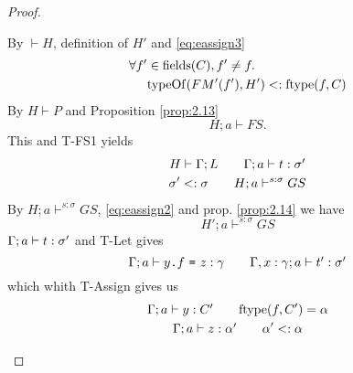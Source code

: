 \begin{proof}
\begin{description}
\begin{description}
\begin{description}
              \vspace{2em}
              By $\vdash H$, definition of $H'$ and \eqref{eq:eassign3}
              \begin{equation} \label{eq:eassign4}
                \begin{aligned}
                  \forall f' &\in \mbox{$\mathrm{fields}$}(C), f' \neq f. \\ 
                                 &\mbox{$\mathrm{typeOf}$}(FM'(f'), H') <: \mbox{$\mathrm{ftype}$}(f, C)
                \end{aligned}
              \end{equation}
              By $H \vdash P$ and Proposition \ref{prop:2.13}
              \begin{equation} \label{eq:eassign5}
                H;a \vdash FS.
              \end{equation}
              This and {\sc T-FS1} yields
              \begin{equation}\label{eq:eassign6}
                \begin{gathered}
                  H \vdash \Gamma; L \quad\quad \mbox{$\Gamma;a\vdash t:\sigma'$} \\
                  \sigma' <: \sigma \quad\quad H; a \vdash^{s: \sigma} GS
                \end{gathered}
              \end{equation}
              By $H;a \vdash^{s: \sigma} GS$, \eqref{eq:eassign2} and prop.
              \ref{prop:2.14} we have 
              \begin{equation} \label{eq:eassign7} 
                H'; a \vdash^{s: \sigma} GS
              \end{equation}
              $\mbox{$\Gamma;a\vdash t:\sigma'$}$ and {\sc T-Let} gives
              \begin{equation} \label{eq:eassign8}
                \mbox{$\Gamma;a\vdash\mbox{\mdseries$y$\texttt{.}$f$~\texttt{=}~$z$}:\gamma$} \quad\quad
                \mbox{$\Gamma, x: \gamma;a\vdash t':\sigma'$}
              \end{equation}
              which whith {\sc T-Assign} gives us
              \begin{equation} \label{eq:eassign9}
                \begin{gathered}
                  \mbox{$\Gamma;a\vdash y:C'$} \quad\quad \mbox{$\mathrm{ftype}$}(f, C') = \alpha \\
                  \mbox{$\Gamma;a\vdash z:\alpha'$} \quad\quad \alpha' <: \alpha
                \end{gathered}
              \end{equation}

\end{description}
\end{description}
\end{description}
\end{proof}
